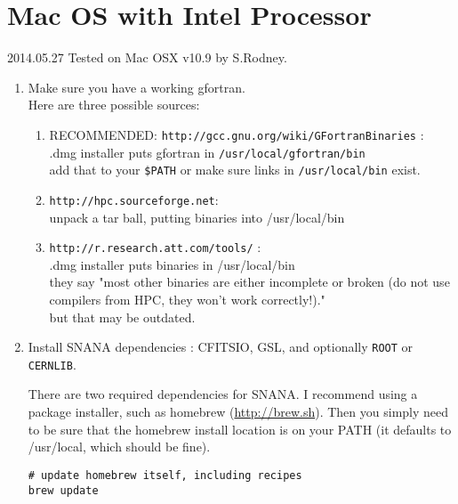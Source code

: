 \documentclass[12pt]{article}
\begin{document}
   \clearpage
   \section{Mac OS with Intel Processor}

2014.05.27  Tested on Mac OSX v10.9 by S.Rodney.

\begin{enumerate}
\item	Make sure you have a working gfortran.\\
 Here are three possible sources:
  \begin{enumerate}
    \item RECOMMENDED: {\tt http://gcc.gnu.org/wiki/GFortranBinaries} : \\
     .dmg installer puts gfortran in {\tt /usr/local/gfortran/bin} \\
     add that to your {\tt \$PATH} or make sure links in {\tt /usr/local/bin} exist.
	 \item {\tt http://hpc.sourceforge.net}:\\
      unpack a tar ball, putting binaries into /usr/local/bin
    \item {\tt http://r.research.att.com/tools/} :\\
      .dmg installer puts binaries in /usr/local/bin\\
      they say "most other binaries are either incomplete or broken (do not use compilers from HPC, they won't work correctly!)."\\
      but that may be outdated.
   \end{enumerate}
%
%

\item 	Install SNANA dependencies : CFITSIO, GSL,
    and optionally {\tt ROOT} or {\tt CERNLIB}.

  There are two required dependencies for SNANA.  
  I recommend using a package installer, such as homebrew (\url{http://brew.sh}).  
  Then you simply need to be sure that the homebrew install location is on your PATH
  (it defaults to /usr/local, which should be fine).

\begin{verbatim}
# update homebrew itself, including recipes
brew update  


\end{verbatim}
\end{enumerate}
\end{document}
